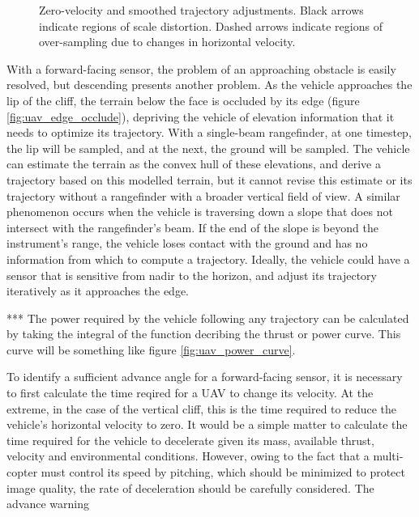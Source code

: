 \documentclass[10pt,a4paper]{report}
\begin{document}
\begin{figure}
\centering
\def\svgscale{0.5}

\caption{Zero-velocity and smoothed trajectory adjustments. Black arrows indicate regions of scale distortion. Dashed arrows indicate regions of over-sampling due to changes in horizontal velocity.}
\label{fig:uav_smooth_traj}
\end{figure}


With a forward-facing sensor, the problem of an approaching obstacle is easily resolved, but descending presents another problem. As the vehicle approaches the lip of the cliff, the terrain below the face is occluded by its edge (figure \ref{fig:uav_edge_occlude}), depriving the vehicle of elevation information that it needs to optimize its trajectory. With a single-beam rangefinder, at one timestep, the lip will be sampled, and at the next, the ground will be sampled. The vehicle can estimate the terrain as the convex hull of these elevations, and derive a trajectory based on this modelled terrain, but it cannot revise this estimate or its trajectory without a rangefinder with a broader vertical field of view. A similar phenomenon occurs when the vehicle is traversing down a slope that does not intersect with the rangefinder's beam. If the end of the slope is beyond the instrument's range, the vehicle loses contact with the ground and has no information from which to compute a trajectory.  Ideally, the vehicle could have a sensor that is sensitive from nadir to the horizon, and adjust its trajectory iteratively as it approaches the edge. 

*** The power required by the vehicle following any trajectory can be calculated by taking the integral of the function decribing the thrust or power curve. This curve will be something like figure \ref{fig:uav_power_curve}.

To identify a sufficient advance angle for a forward-facing sensor, it is necessary to first calculate the time reqired for a UAV to change its velocity. At the extreme, in the case of the vertical cliff, this is the time required to reduce the vehicle's horizontal velocity to zero. It would be a simple matter to calculate the time required for the vehicle to decelerate given its mass, available thrust, velocity and environmental conditions. However, owing to the fact that a multi-copter must control its speed by pitching, which should be minimized to protect image quality, the rate of deceleration should be carefully considered. The advance warning
\end{document}
